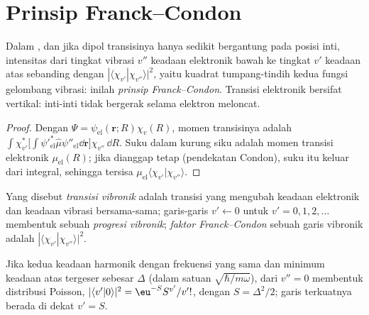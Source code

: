 \section{Prinsip Franck--Condon}

\begin{theorem}\label{thm:b3:electronic-spectroscopy:franck-condon}
Dalam , dan jika dipol transisinya hanya sedikit
bergantung pada posisi inti, intensitas  dari tingkat
vibrasi $v''$ keadaan elektronik bawah ke tingkat $v'$ keadaan atas sebanding
dengan $|\langle\chi_{v'}|\chi_{v''}\rangle|^2$, yaitu kuadrat tumpang-tindih kedua
fungsi gelombang vibrasi: inilah \emph{prinsip
Franck--Condon}. Transisi elektronik bersifat
vertikal: inti-inti tidak bergerak selama elektron meloncat.
\end{theorem}

\begin{proof}
Dengan $\Psi = \psi_{\mathrm{el}}(\mathbf r;R)\chi_v(R)$, momen transisinya adalah
$\int\chi_{v'}^*\big[\int\psi'^*_{\mathrm{el}}\hat\mu\psi''_{\mathrm{el}}\dd\mathbf r\big]
\chi_{v''}\,\dd R$. Suku dalam kurung siku adalah momen transisi elektronik
$\mu_{\mathrm{el}}(R)$; jika dianggap tetap (pendekatan Condon), suku itu keluar
dari integral, sehingga tersisa $\mu_{\mathrm{el}}\langle\chi_{v'}|\chi_{v''}\rangle$.
\end{proof}

\begin{definition}\label{def:b3:electronic-spectroscopy:vibronic}
Yang disebut \emph{transisi vibronik} adalah
transisi yang mengubah keadaan elektronik dan keadaan vibrasi bersama-sama;
garis-garis $v' \leftarrow 0$ untuk $v' = 0, 1, 2,
\dots$ membentuk sebuah \emph{progresi vibronik};
\emph{faktor Franck--Condon} sebuah garis
vibronik adalah $|\langle\chi_{v'}|\chi_{v''}\rangle|^2$.
\end{definition}

\begin{proposition}\label{prop:b3:electronic-spectroscopy:displaced}
Jika kedua keadaan harmonik dengan frekuensi yang sama dan minimum keadaan
atas tergeser sebesar $\Delta$ (dalam satuan $\sqrt{\hbar/m\omega}$),  dari $v'' = 0$ membentuk distribusi Poisson,
$|\langle v'|0\rangle|^2 = \eu^{-S}S^{v'}/v'!$, dengan $S = \Delta^2/2$; garis
terkuatnya berada di dekat $v' = S$.
\end{proposition}
\admitted

